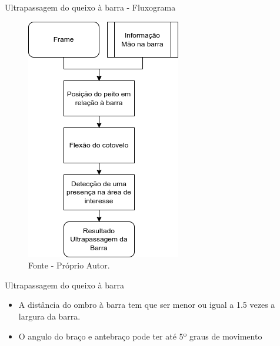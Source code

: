 \begin{frame}{Ultrapassagem do queixo à barra - Fluxograma}
    \begin{figure}[!ht]
        \centering
            \includegraphics[scale=0.42]{img/desenvolvimento/ultrapassagemBarra/fluxograma.png}
        \caption*{Fonte - Próprio Autor.}
    \end{figure}
\end{frame}

\begin{frame}{Ultrapassagem do queixo à barra}
    \begin{itemize}
        \item A distância do ombro à barra tem que ser menor ou igual a 1.5 vezes a largura da barra.
        \item O angulo do braço e antebraço pode ter até 5º graus de movimento
    \end{itemize}
\end{frame}


